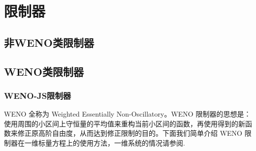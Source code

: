 \documentclass{article}
\numberwithin{equation}{subsection}    %
\begin{document}
\section{限制器}
\subsection{非WENO类限制器}

\subsection{WENO类限制器}
\subsubsection{WENO-JS限制器}
WENO 全称为 Weighted Essentially Non-Oscillatory。WENO 限制器的思想是：使用周围的小区间上守恒量的平均值来重构当前小区间的函数，再使用得到的新函数来修正原高阶自由度，从而达到修正限制的目的。下面我们简单介绍 WENO 限制器在一维标量方程上的使用方法，一维系统的情况请参阅\cite{WENO-js1}.
\end{document}
